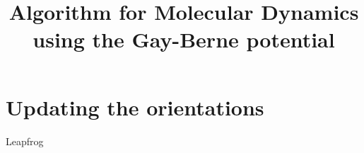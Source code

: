 \documentclass{article}
\title{Algorithm for Molecular Dynamics using the Gay-Berne potential}
\begin{document}
\maketitle

\section{Updating the orientations}
	\begin{algorithm}
		\caption{Leapfrog}\label{euclid}
		\begin{algorithmic}[1]
		\end{algorithmic}
	\end{algorithm}
\end{document}
